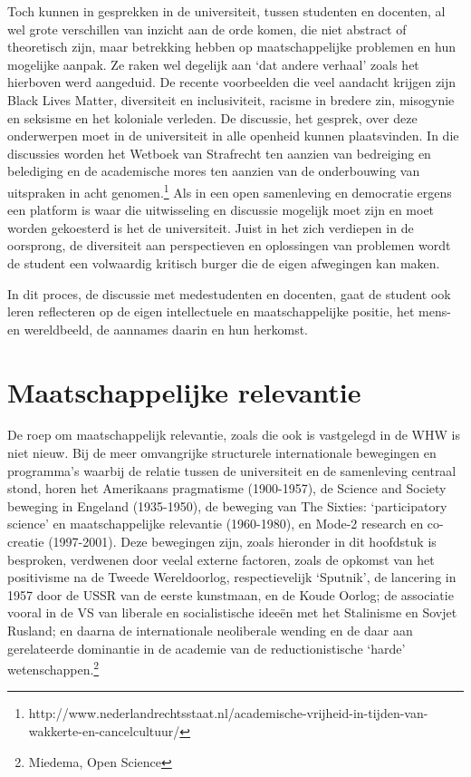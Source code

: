 \documentclass[empirical, authordate, ]{new-jote-article}
\begin{document}
	Toch kunnen in gesprekken in de universiteit, tussen studenten en docenten, al wel grote verschillen van inzicht aan de orde komen, die niet abstract of theoretisch zijn, maar betrekking hebben op maatschappelijke problemen en hun mogelijke aanpak. Ze raken wel degelijk aan ‘dat andere verhaal' zoals het hierboven werd aangeduid. De recente voorbeelden die veel aandacht krijgen zijn Black Lives Matter, diversiteit en inclusiviteit, racisme in bredere zin, misogynie en seksisme en het koloniale verleden. De discussie, het gesprek, over deze onderwerpen moet in de universiteit in alle openheid kunnen plaatsvinden. In die discussies worden het Wetboek van Strafrecht ten aanzien van bedreiging en belediging en de academische mores ten aanzien van de onderbouwing van uitspraken in acht genomen.\footnote{http://www.nederlandrechtsstaat.nl/academische-vrijheid-in-tijden-van-wakkerte-en-cancelcultuur/} Als in een open samenleving en democratie ergens een platform is waar die uitwisseling en discussie mogelijk moet zijn en moet worden gekoesterd is het de universiteit. Juist in het zich verdiepen in de oorsprong, de diversiteit aan perspectieven en oplossingen van problemen wordt de student een volwaardig kritisch burger die de eigen afwegingen kan maken.



	In dit proces, de discussie met medestudenten en docenten, gaat de student ook leren reflecteren op de eigen intellectuele en maatschappelijke positie, het mens- en wereldbeeld, de aannames daarin en hun herkomst.



	\section{Maatschappelijke relevantie}



	De roep om maatschappelijk relevantie, zoals die ook is vastgelegd in de WHW is niet nieuw. Bij de meer omvangrijke structurele internationale bewegingen en programma's waarbij de relatie tussen de universiteit en de samenleving centraal stond, horen het Amerikaans pragmatisme (1900-1957), de Science and Society beweging in Engeland (1935-1950), de beweging van The Sixties: ‘participatory science' en maatschappelijke relevantie (1960-1980), en Mode-2 research en co-creatie (1997-2001). Deze bewegingen zijn, zoals hieronder in dit hoofdstuk is besproken, verdwenen door veelal externe factoren, zoals de opkomst van het positivisme na de Tweede Wereldoorlog, respectievelijk ‘Sputnik', de lancering in 1957 door de USSR van de eerste kunstmaan, en de Koude Oorlog; de associatie vooral in de VS van liberale en socialistische ideeën met het Stalinisme en Sovjet Rusland; en daarna de internationale neoliberale wending en de daar aan gerelateerde dominantie in de academie van de reductionistische ‘harde' wetenschappen.\footnote{Miedema, Open Science}
\end{document}
